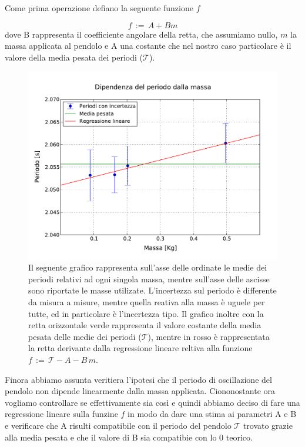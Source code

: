 Come prima operazione defiano la seguente funzione $f$

\begin{equation}
	f \,:=\, A + B m 
\end{equation}
%
dove B rappresenta il coefficiente angolare della retta, che assumiamo nullo, $m$ la massa applicata al pendolo e A una costante che nel nostro caso particolare è il valore della media pesata dei periodi ($\mathcal{T}$).\\

\begin{figure}
    \centering
    \includegraphics[width=120mm]{immagini/masse.pdf}
    \caption{Il seguente grafico rappresenta sull'asse delle ordinate le medie dei periodi relativi ad ogni singola massa, mentre sull'asse delle ascisse sono riportate le masse utilizate. L'incertezza sul periodo è differente da misura a misure, mentre quella reativa alla massa è uguele per tutte, ed in particolare è l'incertezza tipo. Il grafico inoltre con la retta orizzontale verde rappresenta il valore costante della media pesata delle medie dei periodi ($\mathcal{T}$), mentre in rosso è rappresentata la retta derivante dalla regressione lineare reltiva alla funzione $f \,:=\, \mathcal{T} - A - B\,m$.}
    \label{fig: periodo vs masse}
\end{figure}

Finora abbiamo assunta veritiera l'ipotesi che il periodo di oscillazione del pendolo non dipende linearmente dalla massa applicata. Ciononostante ora vogliamo controllare se effettivamente sia così e quindi abbiamo deciso di fare una regressione lineare sulla funzine $f$ in modo da dare una stima ai parametri A e B e verificare che A risulti compatibile con il periodo del pendolo $\mathcal{T}$ trovato grazie alla media pesata e che il valore di B sia compatibie con lo 0 teorico.\\

